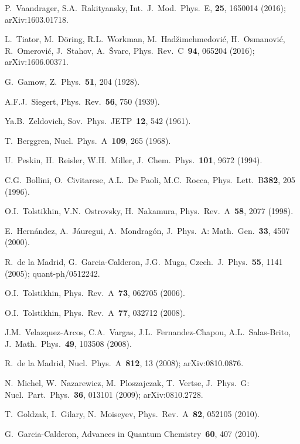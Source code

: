 \documentclass[12pt]{article}
\begin{document}
\begin{thebibliography}{99}
 P.~Vaandrager, S.A.~Rakityansky, 	
Int.~J.~Mod.~Phys.~E, {\bf 25}, 1650014 (2016); {\sf arXiv:1603.01718}.

 L.~Tiator, M.~D\"oring, R.L.~Workman, 
M.~Had\v{z}imehmedovi\'c, H.~Osmanovi\'c, R.~Omerovi\'c, J.~Stahov, 
A.~\v{S}varc, Phys.~Rev.~C~{\bf 94}, 065204 (2016); {\sf arXiv:1606.00371}.

 G.~Gamow, Z.~Phys.~{\bf 51}, 204 (1928). 

 A.F.J.~Siegert, Phys.~Rev.~{\bf 56},
750 (1939). 

 Ya.B.~Zeldovich, Sov.~Phys.~JETP~{\bf 12}, 542 (1961).

 T.~Berggren, Nucl.~Phys.~A~{\bf 109}, 265 (1968).

 U.~Peskin, H.~Reisler, W.H.~Miller, J.~Chem.~Phys.~{\bf 101}, 
9672 (1994).

 C.G.~Bollini, O.~Civitarese, A.L.~De Paoli, M.C.~Rocca,
Phys.~Lett.~B{\bf 382}, 205 (1996).

 O.I.~Tolstikhin, V.N.~Ostrovsky, H.~Nakamura,
Phys.~Rev.~A~{\bf 58}, 2077 (1998).

 E.~Hern\'andez, A.~J\'auregui, A.~Mondrag\'on, 
J.~Phys.~A: Math.~Gen.~{\bf 33}, 4507 (2000).

 R.~de la Madrid, G.~Garcia-Calderon, J.G.~Muga,
Czech.\ J.\ Phys.~{\bf 55}, 1141 (2005); {\sf quant-ph/0512242}.

 O.I.~Tolstikhin, Phys.~Rev.~A~{\bf 73}, 062705 (2006).

 O.I.~Tolstikhin, Phys.~Rev.~A~{\bf 77}, 032712 (2008).

 J.M.~Velazquez-Arcos, C.A.~Vargas, 
J.L.~Fernandez-Chapou, A.L.~Salas-Brito, 
J.~Math.~Phys.~{\bf 49}, 103508 (2008).

 R.~de la Madrid, Nucl.~Phys.~A~{\bf 812}, 13 (2008);
{\sf arXiv:0810.0876}.

 N.~Michel, W.~Nazarewicz, M.~Ploszajczak, T.~Vertse, 
J.~Phys.~G: Nucl.~Part.~Phys.~{\bf 36}, 013101
(2009); {\sf arXiv:0810.2728}.

 T.~Goldzak, I.~Gilary, N.~Moiseyev,
Phys.~Rev.~A~{\bf 82}, 052105 (2010).

 G.~Garcia-Calderon, 
Advances in Quantum Chemistry~{\bf 60}, 407 (2010).


\end{thebibliography}
\end{document}
